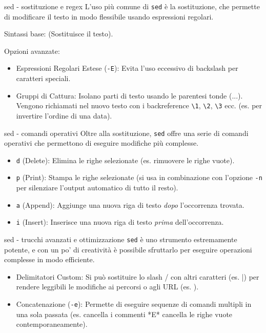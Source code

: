 \begin{frame}[fragile]{sed - sostituzione e regex}
  L'uso più comune di \texttt{sed} è la sostituzione, che permette di 
  modificare il testo in modo flessibile usando espressioni regolari.
  \bigskip

  Sintassi base:  (Sostituisce il testo).

  Opzioni avanzate:
  \begin{itemize}
	\item Espressioni Regolari Estese (\texttt{-E}): Evita l'uso eccessivo di backslash per caratteri speciali.
	\item Gruppi di Cattura: Isolano parti di testo usando le parentesi tonde (...). Vengono richiamati nel nuovo testo con i backreference \verb|\1|, \verb|\2|, \verb|\3| ecc. (es. per invertire l'ordine di una data).
  \end{itemize}

\end{frame}

\begin{frame}[fragile]{sed - comandi operativi}
  Oltre alla sostituzione, \texttt{sed} offre una serie di comandi operativi che permettono di eseguire modifiche più complesse.
  \bigskip

	\begin{itemize}
		\item \texttt{d} (Delete): Elimina le righe selezionate (es. rimuovere le righe vuote).
		\item \texttt{p} (Print): Stampa le righe selezionate (si usa in combinazione con l'opzione \texttt{-n} per silenziare l'output automatico di tutto il resto).
		\item \texttt{a} (Append): Aggiunge una nuova riga di testo \textit{dopo} l'occorrenza trovata.
		\item \texttt{i} (Insert): Inserisce una nuova riga di testo \textit{prima} dell'occorrenza.
	\end{itemize}

\end{frame}

\begin{frame}[fragile]{sed - trucchi avanzati e ottimizzazione}
  \texttt{sed} è uno strumento estremamente potente, e con un po' di creatività è possibile sfruttarlo per eseguire operazioni complesse in modo efficiente.
  \bigskip

  \begin{itemize}
	\item Delimitatori Custom: Si può sostituire lo slash / con altri caratteri (es. |) per rendere leggibili le modifiche ai percorsi o agli URL (es. ).
	\item Concatenazione (\texttt{-e}): Permette di eseguire sequenze di comandi multipli in una sola passata (es. cancella i commenti *E* cancella le righe vuote contemporaneamente).
  \end{itemize}
\end{frame}
